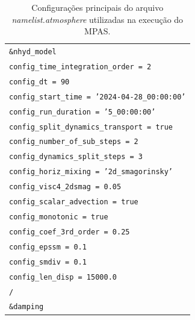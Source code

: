 \documentclass[12pt,a4paper,oneside]{book}
\providecommand{\arraybackslash}{\tabularnewline}
\begin{document}
\begin{longtable}[]{@{}
  >{\raggedright\arraybackslash}p{}@{}}
\caption{Configurações principais do arquivo \textit{namelist.atmosphere} utilizadas na execução do MPAS.}\label{tab:tabela-03}\\
\toprule\noalign{}
\endfirsthead
\endhead
\bottomrule\noalign{}
\endlastfoot
\texttt{\&nhyd\_model} \\
\texttt{\hspace*{1em}config\_time\_integration\_order = 2} \\
\texttt{\hspace*{1em}config\_dt = 90} \\
\texttt{\hspace*{1em}config\_start\_time = '2024-04-28\_00:00:00'} \\
\texttt{\hspace*{1em}config\_run\_duration = '5\_00:00:00'} \\
\texttt{\hspace*{1em}config\_split\_dynamics\_transport = true} \\
\texttt{\hspace*{1em}config\_number\_of\_sub\_steps = 2} \\
\texttt{\hspace*{1em}config\_dynamics\_split\_steps = 3} \\
\texttt{\hspace*{1em}config\_horiz\_mixing = '2d\_smagorinsky'} \\
\texttt{\hspace*{1em}config\_visc4\_2dsmag = 0.05} \\
\texttt{\hspace*{1em}config\_scalar\_advection = true} \\
\texttt{\hspace*{1em}config\_monotonic = true} \\
\texttt{\hspace*{1em}config\_coef\_3rd\_order = 0.25} \\
\texttt{\hspace*{1em}config\_epssm = 0.1} \\
\texttt{\hspace*{1em}config\_smdiv = 0.1} \\
\texttt{\hspace*{1em}config\_len\_disp = 15000.0} \\
\texttt{/} \\
\texttt{\&damping} \\

\end{longtable}
\end{document}
